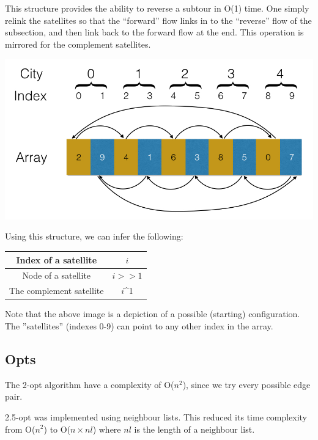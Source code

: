 \documentclass[paper=a4, fontsize=11pt,numbers=endperiod]{scrartcl} %
\numberwithin{equation}{section} %
\numberwithin{figure}{section} %
\numberwithin{table}{section} %
\begin{document}
This structure provides the ability to reverse a subtour in O(1) time.
One simply relink the satellites so that the ``forward'' flow links in to the ``reverse'' flow of the subsection, and then link back to the forward flow at the end.
This operation is mirrored for the complement satellites.


\begin{center}
\includegraphics[scale=0.3]{satellite}
\end{center}

Using this structure, we can infer the following:\\
\begin{table}[h]
  \centering
  \begin{tabular}{|c|c|}
    \hline
    Index of a satellite & $i$ \\ \hline
    Node of a satellite & $i>>1$ \\ \hline
    The complement satellite & $i$\^{}1 \\ \hline
  \end{tabular}
\end{table}


Note that the above image is a depiction of a possible (starting) configuration. The ''satellites'' (indexes 0-9) can point to any other index in the array.

\subsection{Opts}
The 2-opt algorithm have a complexity of O($n^2$), since we try every possible edge pair.

2.5-opt was implemented using neighbour lists.
This reduced its time complexity from O($n^2$) to O($n\times nl$) where $nl$ is the length of a neighbour list.
\end{document}
